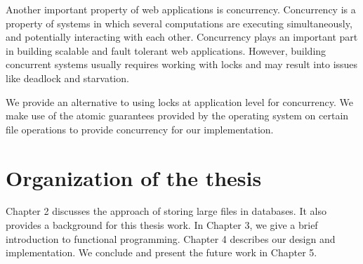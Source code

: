 Another important property of web applications is concurrency. Concurrency is a property of systems in which several computations are executing simultaneously, and potentially interacting with each other. Concurrency plays an important part in building scalable and fault tolerant web applications. However, building concurrent systems usually requires working with locks and may result into issues like deadlock and starvation.

We provide an alternative to using locks at application level for concurrency. We make use of the atomic guarantees provided by the operating system on certain file operations to provide concurrency for our implementation.

\section{Organization of the thesis}
Chapter 2 discusses the approach of storing large files in databases. It also provides a background for this thesis work. In Chapter 3, we give a brief introduction to functional programming. Chapter 4 describes our design and implementation. We conclude and present the future work in Chapter 5.
